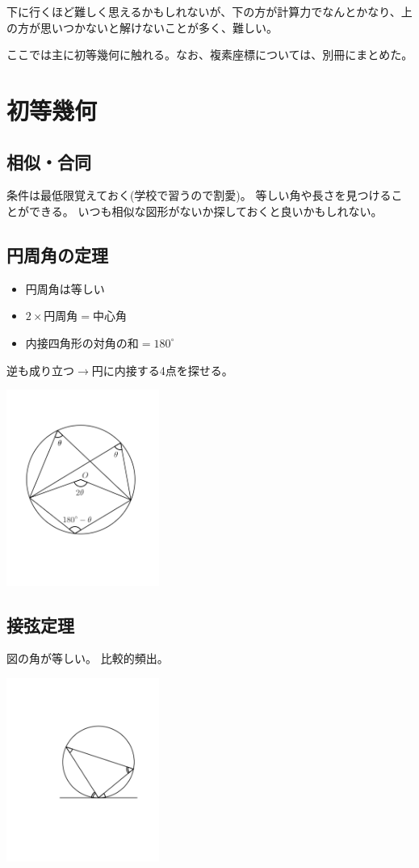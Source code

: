 \documentclass[uplatex,fleqn]{jsbook}
\begin{document}
下に行くほど難しく思えるかもしれないが、下の方が計算力でなんとかなり、上の方が思いつかないと解けないことが多く、難しい。

ここでは主に初等幾何に触れる。なお、複素座標については、別冊にまとめた。
\section{初等幾何}

\subsection{相似・合同}
条件は最低限覚えておく(学校で習うので割愛)。
等しい角や長さを見つけることができる。
いつも相似な図形がないか探しておくと良いかもしれない。

\subsection{円周角の定理}

\begin{itemize}
    \item 円周角は等しい
    \item $2\times\text{円周角}=\text{中心角}$
    \item 内接四角形の対角の和$=180^{\circ}$
\end{itemize}

逆も成り立つ$\rightarrow$円に内接する4点を探せる。

\includegraphics[clip,width=5cm]{figures/inscribed-angle.pdf}

\subsection{接弦定理}
図の角が等しい。
比較的頻出。

\includegraphics[clip,width=5cm]{figures/setsugen.pdf}
\end{document}
